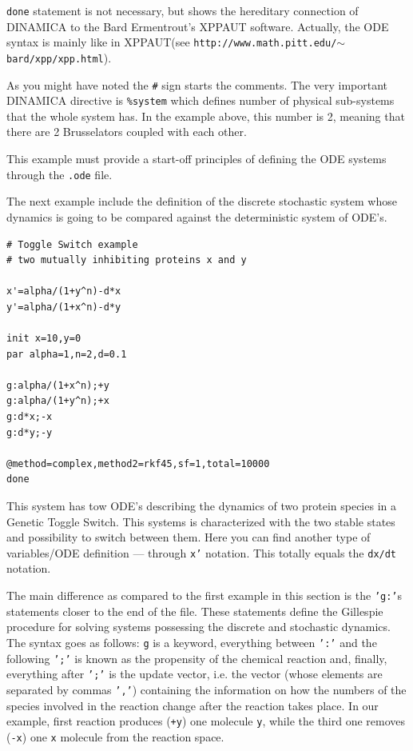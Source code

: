 \documentclass[11pt,a4paper]{article}
\begin{document}
\texttt{done} statement is not necessary, but shows the hereditary connection of
DINAMICA to the Bard Ermentrout's XPPAUT software. Actually, the ODE syntax is mainly
like in XPPAUT\newline (see \texttt{http://www.math.pitt.edu/$\sim$bard/xpp/xpp.html}).

As you might have noted the \texttt{\#} sign starts the comments. The very important
DINAMICA directive is \texttt{\%system} which defines number of physical sub-systems
that the whole system has. In the example above, this number is 2, meaning that there
are 2 Brusselators coupled with each other.

This example must provide a start-off principles of defining the ODE systems through
the \texttt{.ode} file.

The next example include the definition of the discrete stochastic system whose
dynamics is going to be compared against the deterministic system of ODE's.
\begin{verbatim}
# Toggle Switch example
# two mutually inhibiting proteins x and y

x'=alpha/(1+y^n)-d*x
y'=alpha/(1+x^n)-d*y

init x=10,y=0
par alpha=1,n=2,d=0.1

g:alpha/(1+x^n);+y
g:alpha/(1+y^n);+x
g:d*x;-x
g:d*y;-y

@method=complex,method2=rkf45,sf=1,total=10000
done
\end{verbatim}
This system has tow ODE's describing the dynamics of two protein species in a Genetic
Toggle Switch. This systems is characterized with the two stable states and
possibility to switch between them. Here you can find another type of variables/ODE
definition --- through \texttt{x'} notation. This totally equals the \texttt{dx/dt}
notation.

The main difference as compared to the first example in this section is the
\texttt{'g:'}s statements closer to the end of the file. These statements define the
Gillespie procedure for solving systems possessing the discrete and stochastic
dynamics. The syntax goes as follows: \texttt{g} is a keyword, everything between
\texttt{':'} and the following \texttt{';'} is known as the propensity of the
chemical reaction and, finally, everything after \texttt{';'} is the update vector,
i.e. the vector (whose elements are separated by commas \texttt{','}) containing the
information on how the numbers of the species involved in the reaction change after
the reaction takes place. In our example, first reaction produces (\texttt{+y}) one
molecule \texttt{y}, while the third one removes (\texttt{-x}) one \texttt{x}
molecule from the reaction space.
\end{document}
